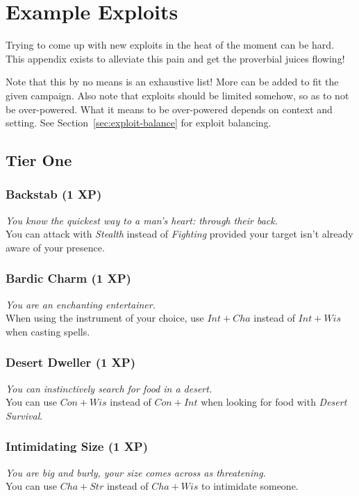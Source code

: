 \chapter{Example Exploits}\label{app:exploits}
Trying to come up with new exploits in the heat of the moment can be hard.
This appendix exists to alleviate this pain and get the proverbial juices flowing!

Note that this by no means is an exhaustive list!
More can be added to fit the given campaign.
Also note that exploits should be limited somehow, so as to not be over-powered. What it means to be over-powered depends on context and setting. See Section~\ref{sec:exploit-balance} for exploit balancing.

\section{Tier One}

\subsection{Backstab (1 XP)}
\textit{You know the quickest way to a man's heart: through their back.}\\
You can attack with \textit{Stealth} instead of \textit{Fighting} provided your target isn't already aware of your presence.

\subsection{Bardic Charm (1 XP)}
\textit{You are an enchanting entertainer.}\\
When using the instrument of your choice, use $Int+Cha$ instead of $Int+Wis$ when casting spells.

\subsection{Desert Dweller (1 XP)}
\textit{You can instinctively search for food in a desert.}\\
You can use $Con + Wis$ instead of $Con + Int$ when looking for food with \textit{Desert Survival}.

\subsection{Intimidating Size (1 XP)}
\textit{You are big and burly, your size comes across as threatening.}\\
You can use $Cha + Str$ instead of $Cha + Wis$ to intimidate someone.

